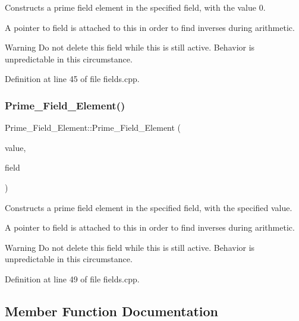 Constructs a prime field element in the specified field, with the value 0. 

A pointer to {\ttfamily field} is attached to {\ttfamily this} in order to find inverses during arithmetic. \begin{DoxyWarning}{Warning}
Do not delete this field while {\ttfamily this} is still active. Behavior is unpredictable in this circumstance. 
\end{DoxyWarning}


Definition at line 45 of file fields.\+cpp.

\mbox{\label{class_prime___field___element_a6868c9957c5ddb60b2313d51b0565636}} 
\subsubsection{\texorpdfstring{Prime\+\_\+\+Field\+\_\+\+Element()}{Prime\_Field\_Element()}\hspace{0.1cm}{\footnotesize\ttfamily [2/2]}}
{\footnotesize\ttfamily Prime\+\_\+\+Field\+\_\+\+Element\+::\+Prime\+\_\+\+Field\+\_\+\+Element (\begin{DoxyParamCaption}\item[{C\+O\+E\+F\+\_\+\+T\+Y\+PE}]{value,  }\item[{\hyperlink{class_prime___field}{Prime\+\_\+\+Field} $\ast$}]{field }\end{DoxyParamCaption})}



Constructs a prime field element in the specified field, with the specified value. 

A pointer to {\ttfamily field} is attached to {\ttfamily this} in order to find inverses during arithmetic. \begin{DoxyWarning}{Warning}
Do not delete this field while {\ttfamily this} is still active. Behavior is unpredictable in this circumstance. 
\end{DoxyWarning}


Definition at line 49 of file fields.\+cpp.



\subsection{Member Function Documentation}
\mbox{\label{class_prime___field___element_a28870a113aad5a9981512aca6c04d314}} 
